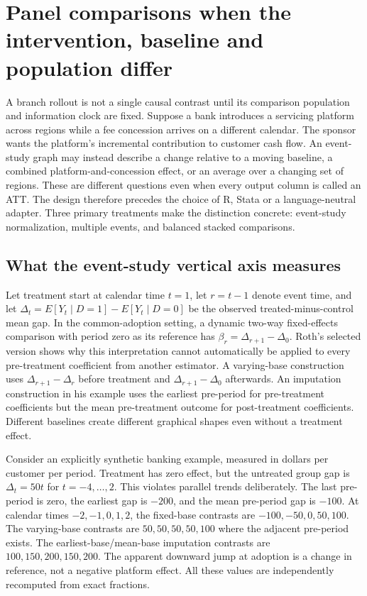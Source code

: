 \section{Panel comparisons when the intervention, baseline and population differ}
\label{sec:exec28-panel-designs}

A branch rollout is not a single causal contrast until its comparison population and information clock are fixed.
Suppose a bank introduces a servicing platform across regions while a fee concession arrives on a different calendar.
The sponsor wants the platform's incremental contribution to customer cash flow. An event-study graph may instead describe
a change relative to a moving baseline, a combined platform-and-concession effect, or an average over a changing set of regions.
These are different questions even when every output column is called an ATT. The design therefore precedes the choice of R,
Stata or a language-neutral adapter. Three primary treatments make the distinction concrete: event-study normalization,
multiple events, and balanced stacked comparisons.\citep{exec28_panel_roth,exec28_panel_tsai,exec28_panel_wing}

\subsection{What the event-study vertical axis measures}

Let treatment start at calendar time $t=1$, let $r=t-1$ denote event time, and let
$\Delta_t=E[Y_t\mid D=1]-E[Y_t\mid D=0]$ be the observed treated-minus-control mean gap.
In the common-adoption setting, a dynamic two-way fixed-effects comparison with period zero as its reference has
$\beta_r=\Delta_{r+1}-\Delta_0$. Roth's selected version shows why this interpretation cannot automatically be applied
to every pre-treatment coefficient from another estimator. A varying-base construction uses $\Delta_{r+1}-\Delta_r$
before treatment and $\Delta_{r+1}-\Delta_0$ afterwards. An imputation construction in his example uses the earliest
pre-period for pre-treatment coefficients but the mean pre-treatment outcome for post-treatment coefficients.
Different baselines create different graphical shapes even without a treatment effect.\citep{exec28_panel_roth}

Consider an explicitly synthetic banking example, measured in dollars per customer per period. Treatment has zero effect,
but the untreated group gap is $\Delta_t=50t$ for $t=-4,\ldots,2$. This violates parallel trends deliberately. The last
pre-period is zero, the earliest gap is $-200$, and the mean pre-period gap is $-100$. At calendar times $-2,-1,0,1,2$,
the fixed-base contrasts are $-100,-50,0,50,100$. The varying-base contrasts are $50,50,50,50,100$ where the adjacent
pre-period exists. The earliest-base/mean-base imputation contrasts are $100,150,200,150,200$.
The apparent downward jump at adoption is a change in reference, not a negative platform effect. All these values
are independently recomputed from exact fractions.\citep{exec28_panel_reference}

